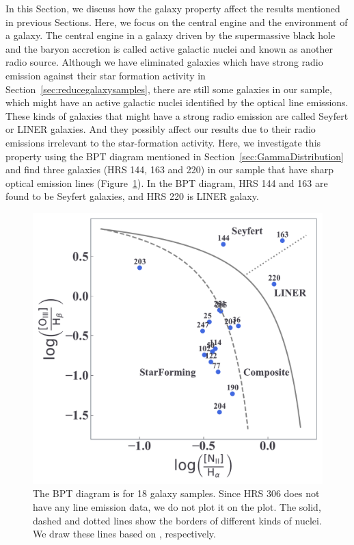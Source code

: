 In this Section, we discuss how the galaxy property affect the results mentioned in previous Sections.
Here, we focus on the central engine and the environment of a galaxy.
The central engine in a galaxy driven by the supermassive black hole and the baryon accretion is called active galactic nuclei and known as another radio source.
Although we have eliminated galaxies which have strong radio emission against their star formation activity in Section~\ref{sec:reducegalaxysamples}, there are still some galaxies in our sample, which might have an active galactic nuclei identified by the optical line emissions.
These kinds of galaxies that might have a strong radio emission are called Seyfert or LINER galaxies.
And they possibly affect our results due to their radio emissions irrelevant to the star-formation activity.
Here, we investigate this property using the BPT diagram mentioned in Section~\ref{sec:GammaDistribution} and find three galaxies (HRS 144, 163 and 220) in our sample that have sharp optical emission lines (Figure~\ref{fig:bpt_diagram}).
In the BPT diagram, HRS 144 and 163 are found to be Seyfert galaxies, and HRS 220 is LINER galaxy.

\begin{figure}[htbp]
	\centering
	\includegraphics[width=.7\linewidth]{Chapter_6/Figures/Discuss_bpt.pdf}
    \caption[BPT diagram for 18 galaxy samples]{\label{fig:bpt_diagram}
        The BPT diagram is for 18 galaxy samples.
        Since HRS 306 does not have any line emission data, we do not plot it on the plot.
        The solid, dashed and dotted lines show the borders of different kinds of nuclei.
        We draw these lines based on \citet{Kewley2001, Kauffmann2003, Schawinski2007}, respectively.
    }
\end{figure}

